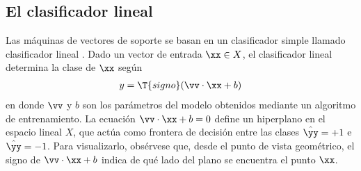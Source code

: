 %
%
\subsection{El clasificador lineal}
%
Las máquinas de vectores de soporte se basan en un clasificador simple
llamado clasificador lineal \cite{nilsson}.
Dado un vector de entrada $\xx\in{}X$, el clasificador lineal
determina la clase de $\xx$ según
%
\begin{align*}
  y = \T{signo}(\vv\cdot\xx+b)
\end{align*}
%
en donde $\vv$ y $b$ son los parámetros del modelo obtenidos mediante
un algoritmo de entrenamiento.
La ecuación $\vv\cdot\xx+b=0$ define un hiperplano en el espacio lineal
$X$, que actúa como frontera de decisión entre las clases
$\hat{\yy}=+1$ e $\hat{\yy}=-1$.
Para visualizarlo, obsérvese que, desde el punto de vista geométrico,
el signo de $\vv\cdot\xx+b$ indica de qué lado del plano se encuentra
el punto $\xx$.
